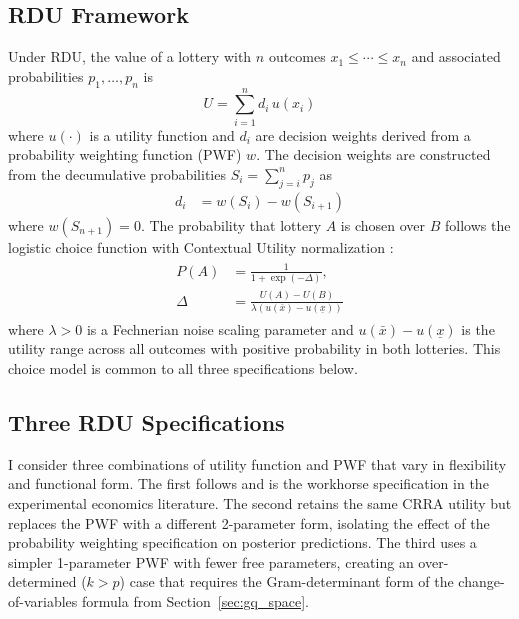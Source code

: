 \documentclass[12pt,a4paper]{article}
\theoremstyle{definition}
\theoremstyle{remark}
\begin{document}
\subsection{RDU Framework}
\label{sec:rdu_framework}

Under RDU, the value of a lottery with $n$ outcomes $x_1 \leq \cdots \leq x_n$
and associated probabilities $p_1, \ldots, p_n$ is
\begin{equation}
  \label{eq:rdu}
  U = \sum_{i=1}^{n} d_i \, u(x_i)
\end{equation}
where $u(\cdot)$ is a utility function and $d_i$ are decision weights derived
from a probability weighting function (PWF) $w$. The decision weights are
constructed from the decumulative probabilities $S_i = \sum_{j=i}^n p_j$ as
\begin{align}
  \label{eq:decision_weight}
  d_i &= w(S_i) - w(S_{i+1})
\end{align}
where $w(S_{n+1}) = 0$. The probability that lottery $A$ is chosen over $B$
follows the logistic choice function with Contextual Utility normalization
\parencite{Wilcox2011}:
\begin{align}
\label{eq:likelihood}
\begin{split}
  P(A) &= \frac{1}{1 + \exp\left(-\Delta\right)}, \\
  \Delta &= \frac{U(A) - U(B)}{\lambda \left(u(\bar{x}) - u(\underline{x})\right)}
\end{split}
\end{align}
where $\lambda > 0$ is a Fechnerian noise scaling parameter and
$u(\bar{x}) - u(\underline{x})$ is the utility range across all outcomes with
positive probability in both lotteries. This choice model is common to all
three specifications below.

\subsection{Three RDU Specifications}
\label{sec:three_models}

I consider three combinations of utility function and PWF that vary in
flexibility and functional form. The first follows \textcite{Gao2022} and is
the workhorse specification in the experimental economics literature. The
second retains the same CRRA utility but replaces the PWF with a different
2-parameter form, isolating the effect of the probability weighting
specification on posterior predictions. The third uses a simpler 1-parameter
PWF with fewer free parameters, creating an over-determined ($k > p$) case
that requires the Gram-determinant form of the change-of-variables formula
from Section~\ref{sec:gq_space}.
\end{document}
